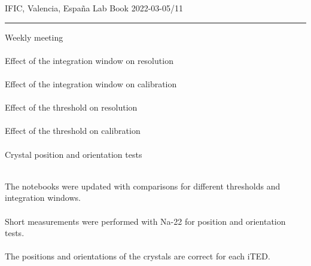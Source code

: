 \begin{center}
  {\Large IFIC, Valencia, España} \hfill {\Large Lab Book} \hfill {\Large 2022-03-05/11}\\
  \rule{\textwidth}{1pt}
\end{center}

\begin{minipage}[t][0.45\textheight][t]{0.97\linewidth}
  \begin{minipage}[t]{0.49\textwidth}
    \hspace{10pt}Weekly meeting\\~\\
    \hspace{10pt}Effect of the integration window on resolution\\~\\
    \hspace{10pt}Effect of the integration window on calibration\\~\\
    \hspace{10pt}Effect of the threshold on resolution\\~\\
    \hspace{10pt}Effect of the threshold on calibration\\~\\
    \hspace{10pt}Crystal position and orientation tests\\~\\
  \end{minipage}
  \begin{minipage}[t]{0.49\textwidth}
    \begin{minipage}[t][0.22\textheight][t]{\textwidth}
        The notebooks were updated with comparisons for different thresholds and integration windows.\\~\\
        Short measurements were performed with Na-22 for position and orientation tests.\\~\\
        The positions and orientations of the crystals are correct for each iTED.
    \end{minipage}
    \begin{minipage}[t][0.22\textheight][t]{\textwidth}
    \end{minipage}
  \end{minipage}  
\end{minipage}

